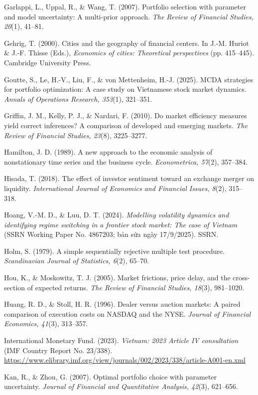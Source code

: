 \begin{list}{}{\setlength{\leftmargin}{1.5em}\setlength{\itemindent}{-1.5em}\setlength{\itemsep}{2pt}\small}
\item Garlappi, L., Uppal, R., \& Wang, T. (2007). Portfolio selection with parameter and model uncertainty: A multi-prior approach. \emph{The Review of Financial Studies, 20}(1), 41–81.
\item Gehrig, T. (2000). Cities and the geography of financial centers. In J.-M. Huriot \& J.-F. Thisse (Eds.), \emph{Economics of cities: Theoretical perspectives} (pp. 415–445). Cambridge University Press.
\item Goutte, S., Le, H.-V., Liu, F., \& von Mettenheim, H.-J. (2025). MCDA strategies for portfolio optimization: A case study on Vietnamese stock market dynamics. \emph{Annals of Operations Research, 353}(1), 321–351.
\item Griffin, J. M., Kelly, P. J., \& Nardari, F. (2010). Do market efficiency measures yield correct inferences? A comparison of developed and emerging markets. \emph{The Review of Financial Studies, 23}(8), 3225–3277.
\item Hamilton, J. D. (1989). A new approach to the economic analysis of nonstationary time series and the business cycle. \emph{Econometrica, 57}(2), 357–384.
\item Hisada, T. (2018). The effect of investor sentiment toward an exchange merger on liquidity. \emph{International Journal of Economics and Financial Issues, 8}(2), 315–318.
\item Hoang, V.-M. D., \& Luu, D. T. (2024). \emph{Modelling volatility dynamics and identifying regime switching in a frontier stock market: The case of Vietnam} (SSRN Working Paper No. 4867203; bản sửa ngày 17/9/2025). SSRN.
\item Holm, S. (1979). A simple sequentially rejective multiple test procedure. \emph{Scandinavian Journal of Statistics, 6}(2), 65–70.
\item Hou, K., \& Moskowitz, T. J. (2005). Market frictions, price delay, and the cross-section of expected returns. \emph{The Review of Financial Studies, 18}(3), 981–1020.
\item Huang, R. D., \& Stoll, H. R. (1996). Dealer versus auction markets: A paired comparison of execution costs on NASDAQ and the NYSE. \emph{Journal of Financial Economics, 41}(3), 313–357.
\item International Monetary Fund. (2023). \emph{Vietnam: 2023 Article IV consultation} (IMF Country Report No. 23/338). \url{https://www.elibrary.imf.org/view/journals/002/2023/338/article-A001-en.xml}
\item Kan, R., \& Zhou, G. (2007). Optimal portfolio choice with parameter uncertainty. \emph{Journal of Financial and Quantitative Analysis, 42}(3), 621–656.

\end{list}
